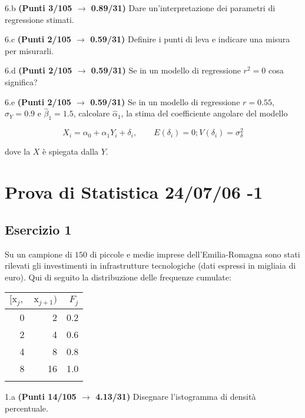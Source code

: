 \documentclass[
  11pt,
]{book}
\theoremstyle{mytheoremstyle}
\theoremstyle{mydefstyle}
\begin{document}
6.b \textbf{(Punti 3/105 \(\rightarrow\) 0.89/31)} Dare un'interpretazione dei parametri di regressione stimati.

6.c \textbf{(Punti 2/105 \(\rightarrow\) 0.59/31)} Definire i punti di leva e indicare una misura per misurarli.

6.d \textbf{(Punti 2/105 \(\rightarrow\) 0.59/31)} Se in un modello di regressione \(r^2=0\) cosa significa?

6.e \textbf{(Punti 2/105 \(\rightarrow\) 0.59/31)} Se in un modello di regressione \(r=0.55\), \(\hat\sigma_Y=0.9\) e \(\hat\beta_1=1.5\), calcolare
\(\hat\alpha_1\), la stima del coefficiente angolare del modello

\[
X_i = \alpha_0+\alpha_1 Y_i + \delta_i, \qquad E(\delta_i)=0; V(\delta_i)=\sigma_\delta^2
\]

dove la \(X\) è spiegata dalla \(Y\).

\section{Prova di Statistica 24/07/06 -1}\label{prova-di-statistica-240706--1}

\subsection{Esercizio 1}\label{esercizio-1-41}

Su un campione di \(150\) di piccole e medie imprese dell'Emilia-Romagna sono stati rilevati gli investimenti in infrastrutture tecnologiche (dati espressi in migliaia di euro). Qui di seguito la distribuzione delle frequenze cumulate:

\begin{table}[H]
\centering
\begin{tabular}{rrr}
\toprule
$[\text{x}_j,$ & $\text{x}_{j+1})$ & $F_j$\\
\midrule
0 & 2 & 0.2\\
2 & 4 & 0.6\\
4 & 8 & 0.8\\
8 & 16 & 1.0\\
 &  & \\
\bottomrule
\end{tabular}
\end{table}

1.a \textbf{(Punti 14/105 \(\rightarrow\) 4.13/31)} Disegnare l'istogramma di densità percentuale.
\end{document}
